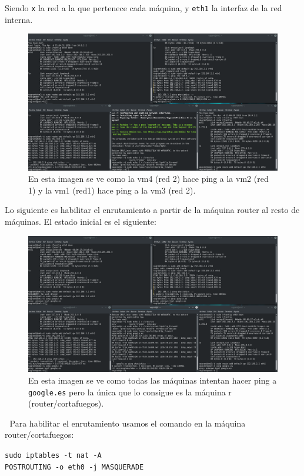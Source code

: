 \documentclass[12pt,letterpaper]{article}
\begin{document}
\begin{itemize}
	Siendo \texttt{x} la red a la que pertenece cada máquina, y \texttt{eth1} la interfaz de la red interna.
	\begin{figure}[h]
		\centering
		\includegraphics[scale=0.25]{Ping.png}
		\caption{En esta imagen se ve como la vm4 (red 2) hace ping a la vm2 (red 1) y la vm1 (red1) hace ping a la vm3 (red 2).}
	\end{figure}
	
	Lo siguiente es habilitar el enrutamiento a partir de la máquina router al resto de máquinas. El estado inicial es el siguiente:
	\newpage
	\begin{figure}[h]
		\centering
		\includegraphics[scale=0.25]{Ping2.png}
		\caption{En esta imagen se ve como todas las máquinas intentan hacer ping a \texttt{google.es} pero la única que lo consigue es la máquina r (router/cortafuegos).}
	\end{figure}
	\textcolor{white}{.}
	\newpage
	 Para habilitar el enrutamiento usamos el comando en la máquina router/cortafuegos:
	 \begin{center}
	 	\texttt{sudo iptables -t nat -A \\POSTROUTING -o eth0 -j MASQUERADE}
	 \end{center}
 	 

\end{itemize}
\end{document}
